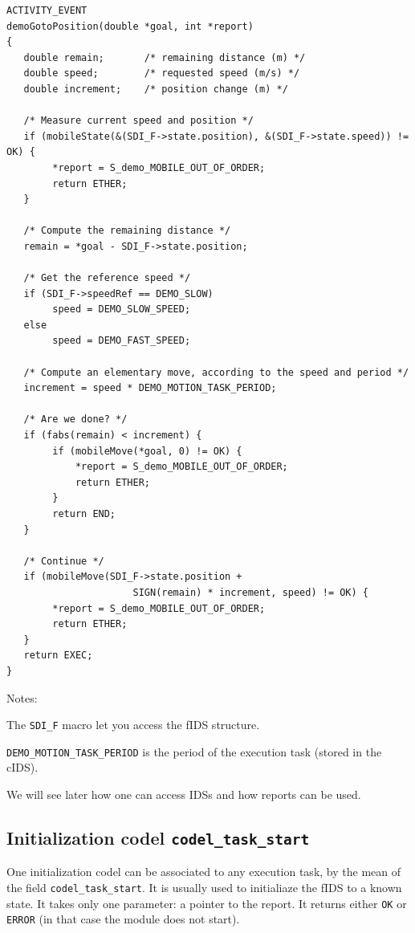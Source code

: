 \begin{center}\begin{cartouche}\small\begin{verbatim}
ACTIVITY_EVENT
demoGotoPosition(double *goal, int *report)
{
   double remain;       /* remaining distance (m) */
   double speed;        /* requested speed (m/s) */
   double increment;    /* position change (m) */

   /* Measure current speed and position */
   if (mobileState(&(SDI_F->state.position), &(SDI_F->state.speed)) != OK) {
        *report = S_demo_MOBILE_OUT_OF_ORDER;
        return ETHER;
   }

   /* Compute the remaining distance */
   remain = *goal - SDI_F->state.position;

   /* Get the reference speed */
   if (SDI_F->speedRef == DEMO_SLOW) 
        speed = DEMO_SLOW_SPEED;
   else
        speed = DEMO_FAST_SPEED;

   /* Compute an elementary move, according to the speed and period */
   increment = speed * DEMO_MOTION_TASK_PERIOD;

   /* Are we done? */
   if (fabs(remain) < increment) {
        if (mobileMove(*goal, 0) != OK) {
            *report = S_demo_MOBILE_OUT_OF_ORDER;
            return ETHER;
        }
        return END;
   }

   /* Continue */
   if (mobileMove(SDI_F->state.position +
                      SIGN(remain) * increment, speed) != OK) {
        *report = S_demo_MOBILE_OUT_OF_ORDER;
        return ETHER;
   }
   return EXEC;
}
\end{verbatim}\end{cartouche}\end{center}

Notes:

The \texttt{SDI\_F} macro let you access the fIDS structure.

\texttt{DEMO\_MOTION\_TASK\_PERIOD} is the period of the execution task
(stored in the cIDS).

We will see later how one can access IDSs and how reports can be used.


\subsection{Initialization codel \texttt{codel\_task\_start}}

One initialization codel can be associated to any  execution task, by the
mean of the field \texttt{codel\_task\_start}. It is  usually used to initialiaze
the fIDS to a known state. It takes only one  parameter: a pointer to the
report.   It returns either \texttt{OK}  or \texttt{ERROR}  (in  that case the
module does not start).

